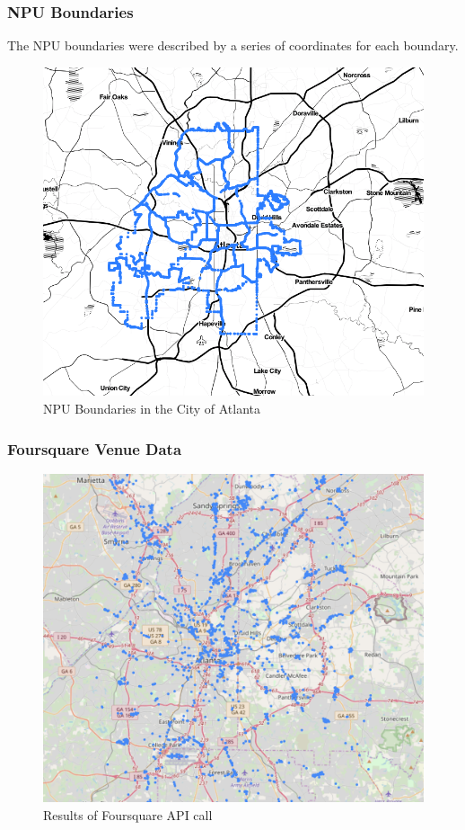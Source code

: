 \documentclass[11pt]{amsart}
\begin{document}
\subsubsection{NPU Boundaries}
The NPU boundaries were described by a series of coordinates for each boundary. 
\begin{figure}
\includegraphics[width=\textwidth]{NPUoutlines.png}
\caption{NPU Boundaries in the City of Atlanta}
\label{fig:npuoutlines}
\end{figure}
\subsubsection{Foursquare Venue Data}
\begin{figure}
\includegraphics[width=\textwidth]{VenuesMap}
\caption{Results of Foursquare API call}
\label{fig:venues}
\end{figure}
\end{document}
